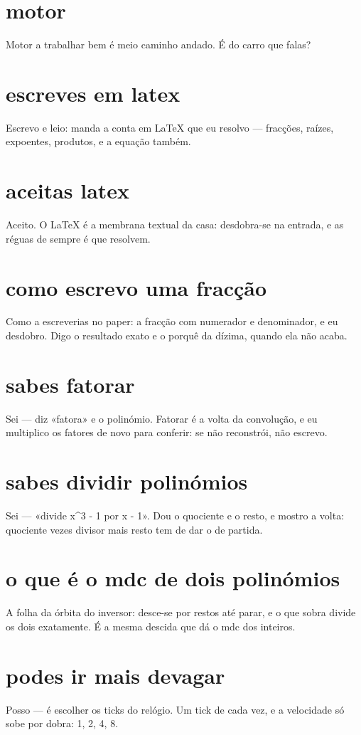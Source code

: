\documentclass[11pt,a4paper]{article}
\begin{document}
\section{motor}
Motor a trabalhar bem é meio caminho andado. É do carro que falas?

\section{escreves em latex}
Escrevo e leio: manda a conta em LaTeX que eu resolvo --- fracções, raízes, expoentes,
produtos, e a equação também.

\section{aceitas latex}
Aceito. O LaTeX é a membrana textual da casa: desdobra-se na entrada, e as réguas de
sempre é que resolvem.

\section{como escrevo uma fracção}
Como a escreverias no paper: a fracção com numerador e denominador, e eu desdobro.
Digo o resultado exato e o porquê da dízima, quando ela não acaba.

\section{sabes fatorar}
Sei --- diz «fatora» e o polinómio. Fatorar é a volta da convolução, e eu multiplico os
fatores de novo para conferir: se não reconstrói, não escrevo.

\section{sabes dividir polinómios}
Sei --- «divide x\^{}3 - 1 por x - 1». Dou o quociente e o resto, e mostro a volta:
quociente vezes divisor mais resto tem de dar o de partida.

\section{o que é o mdc de dois polinómios}
A folha da órbita do inversor: desce-se por restos até parar, e o que sobra divide os
dois exatamente. É a mesma descida que dá o mdc dos inteiros.

\section{podes ir mais devagar}
Posso --- é escolher os ticks do relógio. Um tick de cada vez, e a velocidade só sobe
por dobra: 1, 2, 4, 8.
\end{document}
